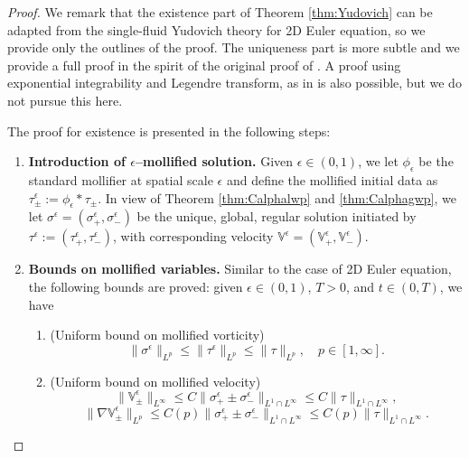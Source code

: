 \documentclass[11pt,reqno]{amsproc}
\newcommand{\la}{\label}
\newcommand{\na}{\nabla}
\newcommand{\be}{\begin{equation}}
\newcommand{\ee}{\end{equation}}
\newcommand{\eps}{\epsilon}
\newcommand{\V}{\mathbb{V}}
\begin{document}
\begin{proof}
We remark that the existence part of Theorem \ref{thm:Yudovich} can be adapted from the single-fluid Yudovich theory for 2D Euler equation, so we provide only the outlines of the proof. The uniqueness part is more subtle and we provide a full proof in the spirit of the original proof of \cite{yudovich}. A proof using exponential integrability and Legendre transform, as in \cite{cde} is also possible, but we do not pursue this here.

The proof for existence is presented in the following steps:
\begin{enumerate}
    \item \textbf{Introduction of $\epsilon$--mollified solution.} Given $\epsilon \in (0,1)$, we let $\phi_\epsilon$ be the standard mollifier at spatial scale $\epsilon$ and define the mollified initial data as $\tau_\pm^\epsilon := \phi_\epsilon * \tau_\pm$. In view of Theorem \ref{thm:Calphalwp} and \ref{thm:Calphagwp}, we let $\sigma^\epsilon = (\sigma_+^\epsilon, \sigma_-^\epsilon)$ be the unique, global, regular solution initiated by $\tau^\eps := (\tau_+^\epsilon,\tau_-^\epsilon)$, with corresponding velocity $\V^\epsilon = (\V^\epsilon_+, \V^\epsilon_-)$.

    \item \textbf{Bounds on mollified variables.} Similar to the case of 2D Euler equation,  the following bounds are proved: given $\epsilon \in (0,1)$, $T > 0$, and $t\in(0,T)$, we have
    \begin{enumerate}
        \item (Uniform bound on mollified vorticity)
        \be\la{est:Lpweps}
        \|\sigma^\epsilon\|_{L^p} \le \|\tau^\eps\|_{L^p} \le \|\tau\|_{L^p},\quad p \in [1,\infty].
        \ee
        \item (Uniform bound on mollified velocity) 
        \be\la{est:LinftyVeps}
        \|\V_\pm^\epsilon\|_{L^\infty} \le C\|\sigma_+^\epsilon \pm \sigma_-^\epsilon\|_{L^1\cap L^\infty} \le C\|\tau\|_{L^1\cap L^\infty},
        \ee
        \be\la{est:W1pVeps}
        \|\na \V^\eps_\pm\|_{L^p} \le C(p)\|\sigma_+^\epsilon \pm \sigma_-^\epsilon\|_{L^1\cap L^\infty} \le C(p)\|\tau\|_{L^1\cap L^\infty}.
        \ee


\end{enumerate}
\end{enumerate}
\end{proof}
\end{document}
